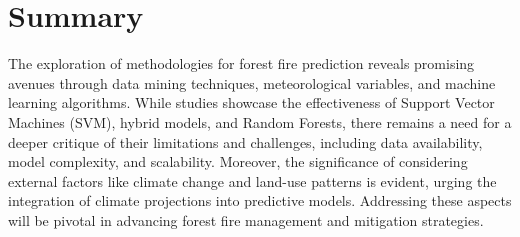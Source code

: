 \section{Summary}
\label{sec:into_back}
The exploration of methodologies for forest fire prediction reveals promising avenues through data mining techniques, meteorological variables, and machine learning algorithms. While studies showcase the effectiveness of Support Vector Machines (SVM), hybrid models, and Random Forests, there remains a need for a deeper critique of their limitations and challenges, including data availability, model complexity, and scalability. Moreover, the significance of considering external factors like climate change and land-use patterns is evident, urging the integration of climate projections into predictive models. Addressing these aspects will be pivotal in advancing forest fire management and mitigation strategies.













